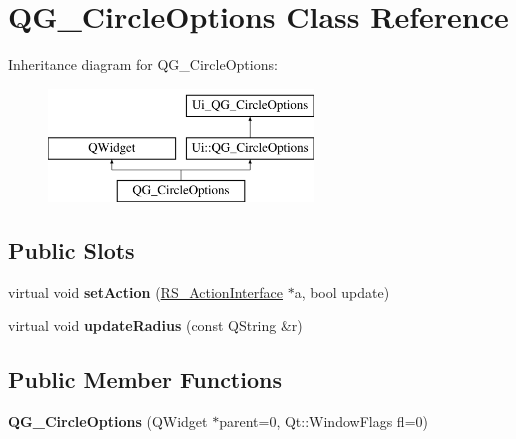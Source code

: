 \hypertarget{classQG__CircleOptions}{\section{Q\-G\-\_\-\-Circle\-Options Class Reference}
\label{classQG__CircleOptions}
}
Inheritance diagram for Q\-G\-\_\-\-Circle\-Options\-:\begin{figure}[H]
\begin{center}
\leavevmode
\includegraphics[height=3.000000cm]{classQG__CircleOptions}
\end{center}
\end{figure}
\subsection*{Public Slots}
\begin{DoxyCompactItemize}
\item 
\hypertarget{classQG__CircleOptions_a2428908412a7a0a7d4ef710bd3374db0}{virtual void {\bfseries set\-Action} (\hyperlink{classRS__ActionInterface}{R\-S\-\_\-\-Action\-Interface} $\ast$a, bool update)}\label{classQG__CircleOptions_a2428908412a7a0a7d4ef710bd3374db0}

\item 
\hypertarget{classQG__CircleOptions_a814e95b3cd544ff97e00bc4d96d94262}{virtual void {\bfseries update\-Radius} (const Q\-String \&r)}\label{classQG__CircleOptions_a814e95b3cd544ff97e00bc4d96d94262}

\end{DoxyCompactItemize}
\subsection*{Public Member Functions}
\begin{DoxyCompactItemize}
\item 
\hypertarget{classQG__CircleOptions_a47e5026d93170b8f4fc4e5f76fb1ae27}{{\bfseries Q\-G\-\_\-\-Circle\-Options} (Q\-Widget $\ast$parent=0, Qt\-::\-Window\-Flags fl=0)}\label{classQG__CircleOptions_a47e5026d93170b8f4fc4e5f76fb1ae27}

\end{DoxyCompactItemize}
